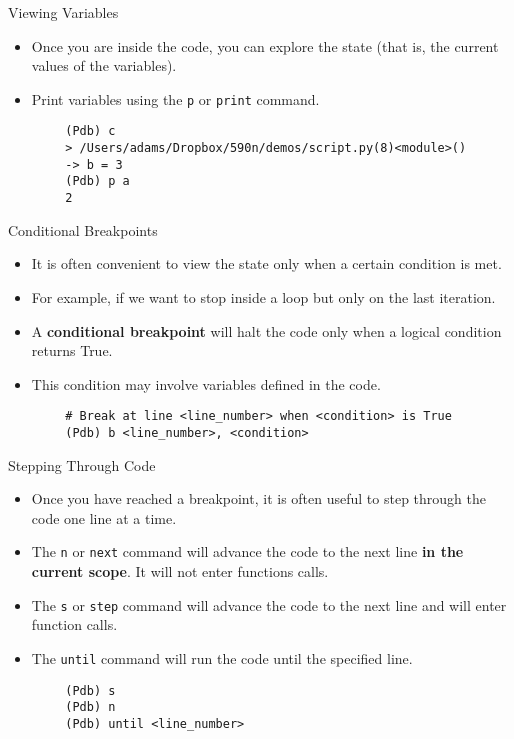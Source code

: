 \documentclass[serif,xcolor=pdftex,dvipsnames,table,hyperref={bookmarks=false,breaklinks}]{beamer}
\begin{document}
\begin{frame}[t,fragile]{Viewing Variables}
	\begin{itemize}[<+->]
		\item Once you are inside the code, you can explore the state (that is, the current values of the variables).
		\item Print variables using the \verb|p| or \verb|print| command.
	\end{itemize}
	\pause
	\begin{lstlisting}
		(Pdb) c
		> /Users/adams/Dropbox/590n/demos/script.py(8)<module>()
		-> b = 3
		(Pdb) p a
		2
	\end{lstlisting}
	
\end{frame}

\begin{frame}[t,fragile]{Conditional Breakpoints}
	
	\begin{itemize}[<+->]
		\item It is often convenient to view the state only when a certain condition is met.
		\item For example, if we want to stop inside a loop but only on the last iteration.
		\item A \textbf{conditional breakpoint} will halt the code only when a logical condition returns True.
		\item This condition may involve variables defined in the code.
	\end{itemize}
	\pause
	\begin{lstlisting}
		# Break at line <line_number> when <condition> is True
		(Pdb) b <line_number>, <condition>
	\end{lstlisting}
	
\end{frame}

\begin{frame}[t,fragile]{Stepping Through Code}
	\begin{itemize}[<+->]
		\item Once you have reached a breakpoint, it is often useful to step through the code one line at a time.
		\item The \verb|n| or \verb|next| command will advance the code to the next line \textbf{in the current scope}. It will not enter functions calls.
		\item The \verb|s| or \verb|step| command will advance the code to the next line and will enter function calls.
		\item The \verb|until| command will run the code until the specified line.
	\end{itemize}
	\pause
	\begin{lstlisting}
		(Pdb) s
		(Pdb) n
		(Pdb) until <line_number>
	\end{lstlisting}
\end{frame}
\end{document}
